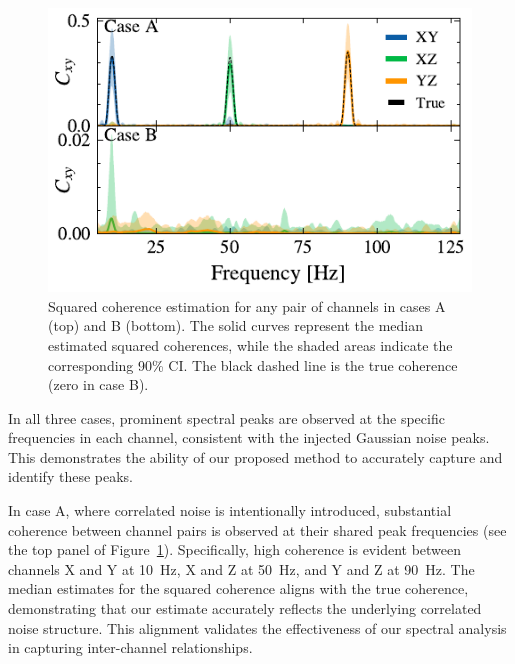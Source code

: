 \documentclass[%
 reprint,
 amsmath,amssymb,
 aps,
 nofootinbib,
]{revtex4-2}
\begin{document}
\begin{figure}
  \includegraphics[width=\columnwidth]{caseAB_coh.pdf}
  \caption{Squared coherence estimation for any pair of channels in cases A (top) and B (bottom). The solid curves represent the median estimated squared coherences, while the shaded areas indicate the corresponding 90\% CI. The black dashed line is the true coherence (zero in case B).}
  \label{fig:squared_coh}
\end{figure}


In all three cases, prominent spectral peaks are observed at the specific frequencies in each channel, consistent with the injected Gaussian noise peaks.  
This demonstrates the ability of our proposed method to accurately capture and identify these peaks. 

In case A, where correlated noise is intentionally introduced, substantial coherence between channel pairs is observed at their shared peak frequencies (see the top panel of Figure~\ref{fig:squared_coh}). 
Specifically, high coherence is evident between channels X and Y at \SI{10}{Hz}, X and Z at \SI{50}{Hz}, and Y and Z at \SI{90}{Hz}. 
The median estimates for the squared coherence aligns with the true coherence, demonstrating that our estimate accurately reflects the underlying correlated noise structure. This alignment validates the effectiveness of our spectral analysis in capturing inter-channel relationships.
\end{document}
